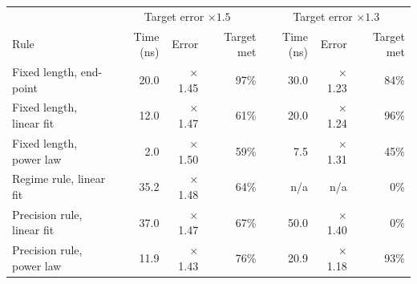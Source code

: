 \begin{tabular}{lrrrrrr}
\toprule
 & \multicolumn{3}{c}{Target error $\times1.5$} & \multicolumn{3}{c}{Target error $\times1.3$} \\
Rule & Time (ns) & Error & Target met & Time (ns) & Error & Target met \\
\midrule
Fixed length, end-point & 20.0 & $\times$1.45 & 97\% & 30.0 & $\times$1.23 & 84\% \\
Fixed length, linear fit & 12.0 & $\times$1.47 & 61\% & 20.0 & $\times$1.24 & 96\% \\
Fixed length, power law & 2.0 & $\times$1.50 & 59\% & 7.5 & $\times$1.31 & 45\% \\
Regime rule, linear fit & 35.2 & $\times$1.48 & 64\% & n/a & n/a & 0\% \\
Precision rule, linear fit & 37.0 & $\times$1.47 & 67\% & 50.0 & $\times$1.40 & 0\% \\
Precision rule, power law & 11.9 & $\times$1.43 & 76\% & 20.9 & $\times$1.18 & 93\% \\
\bottomrule
\end{tabular}
